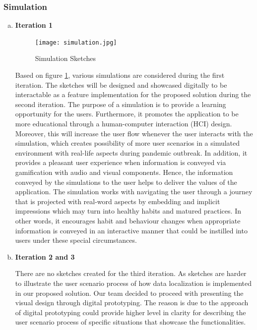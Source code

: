     \subsubsection{Simulation}
      \begin{enumerate}[a)]
        \item \textbf{Iteration 1}
          \begin{figure}[H]
            \centering
            \texttt{[image: simulation.jpg]}
            \caption{Simulation Sketches}
            \label{fig:simulation}
          \end{figure}
          \par Based on figure \ref{fig:simulation}, various simulations are considered during the first iteration. The sketches will be designed and showcased digitally to be interactable as a feature implementation for the proposed solution during the second iteration. The purpose of a simulation is to provide a learning opportunity for the users. Furthermore, it promotes the application to be more educational through a human-computer interaction (HCI) design. Moreover, this will increase the user flow whenever the user interacts with the simulation, which creates possibility of more user scenarios in a simulated environment with real-life aspects during pandemic outbreak. In addition, it provides a pleasant user experience when information is conveyed via gamification with audio and visual components. Hence, the information conveyed by the simulations to the user helps to deliver the values of the application. The simulation works with navigating the user through a journey that is projected with real-word aspects by embedding and implicit impressions which may turn into healthy habits and matured practices. In other words, it encourages habit and behaviour changes when appropriate information is conveyed in an interactive manner that could be instilled into users under these special circumstances.
        \item \textbf{Iteration 2 and 3}
          \par There are no sketches created for the third iteration. As sketches are harder to illustrate the user
          scenario process of how data localization is implemented in our proposed solution. Our team decided
          to proceed with presenting the visual design through digital prototyping. The reason is due to the
          approach of digital prototyping could provide higher level in clarity for describing the user scenario
          process of specific situations that showcase the functionalities.
      \end{enumerate}

